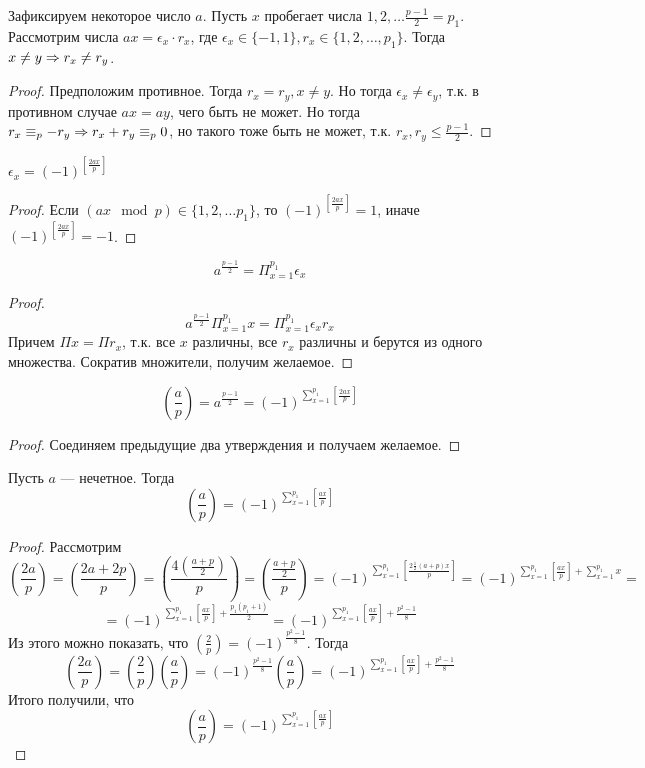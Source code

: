 \begin{proposition}
    Зафиксируем некоторое число \(a\). Пусть \(x\) пробегает числа \(1, 2, \dots \frac{p-1}{2} = p_1\). Рассмотрим числа \(ax = \epsilon_x\cdot r_x\), где \(\epsilon_x \in \{-1, 1\}, r_x \in \{1, 2, \dots, p_1\}\). Тогда \(x \ne y \Rightarrow r_x \ne r_y\).
\end{proposition}
\begin{proof}
    Предположим противное. Тогда \(r_x = r_y, x \ne y\). Но тогда \(\epsilon_x \ne \epsilon_y\), т.к. в противном случае \(ax = ay\), чего быть не может. Но тогда \(r_x \equiv_p -r_y \Rightarrow r_x + r_y \equiv_p 0\), но такого тоже быть не может, т.к. \(r_x, r_y \le \frac{p-1}{2}\).
\end{proof}
\begin{proposition}
    \(\epsilon_x = (-1)^{\left[\frac{2ax}{p}\right] }\)
\end{proposition}
\begin{proof}
    Если \((ax \mod p) \in \{1, 2, \dots p_1\}\), то \((-1)^{\left[\frac{2ax}{p}\right] } = 1\), иначе \((-1)^{\left[\frac{2ax}{p}\right] } = -1\).
\end{proof}
\begin{proposition}
    \[a^{\frac{p-1}{2}} = \Pi_{x = 1}^{p_1}\epsilon_x\]
\end{proposition}
\begin{proof}
    \[a^{\frac{p-1}{2}}\Pi_{x = 1}^{p_1} x = \Pi_{x = 1}^{p_1}\epsilon_x r_x\]
    Причем \(\Pi x = \Pi r_x\), т.к. все \(x\) различны, все \(r_x\) различны и берутся из одного множества. Сократив множители, получим желаемое.
\end{proof}
\begin{proposition}
    \[\left(\frac{a}{p}\right) = a^{\frac{p-1}{2}} = (-1)^{\sum_{x = 1}^{p_1}\left[\frac{2ax}{p}\right] }\]
\end{proposition}
\begin{proof}
    Соединяем предыдущие два утверждения и получаем желаемое.
\end{proof}
\begin{proposition}[Уточнение]
    Пусть \(a\) --- нечетное. Тогда 
    \[\left(\frac{a}{p}\right) = (-1)^{\sum_{x = 1}^{p_1}\left[\frac{ax}{p}\right]}\]
\end{proposition}
\begin{proof}
    Рассмотрим 
    \[\left(\frac{2a}{p}\right) = \left(\frac{2a + 2p}{p}\right) = \left(\frac{4\left(\frac{a + p}{2}\right)}{p}\right) = \left(\frac{\frac{a + p}{2}}{p}\right) = (-1)^{\sum_{x = 1}^{p_1}\left[\frac{2\frac{1}{2}(a + p)x}{p}\right] } = (-1)^{\sum_{x = 1}^{p_1}\left[\frac{ax}{p}\right] + \sum_{x = 1}^{p_1}x} = \]
    \[ = (-1)^{\sum_{x = 1}^{p_1}\left[\frac{ax}{p}\right] + \frac{p_1(p_1 + 1)}{2}} = (-1)^{\sum_{x = 1}^{p_1}\left[\frac{ax}{p}\right] + \frac{p^2 - 1}{8}}\]
    Из этого можно показать, что \(\left(\frac{2}{p}\right) = (-1)^{\frac{p^2 - 1}{8}}\).
    Тогда 
    \[\left(\frac{2a}{p}\right) = \left(\frac{2}{p}\right)\left(\frac{a}{p}\right) = (-1)^\frac{p^2 - 1}{8}\left(\frac{a}{p}\right) = (-1)^{\sum_{x = 1}^{p_1}\left[\frac{ax}{p}\right] + \frac{p^2 - 1}{8}}\]
    Итого получили, что 
    \[\left(\frac{a}{p}\right) = (-1)^{\sum_{x = 1}^{p_1}\left[\frac{ax}{p}\right]}\]
\end{proof}

